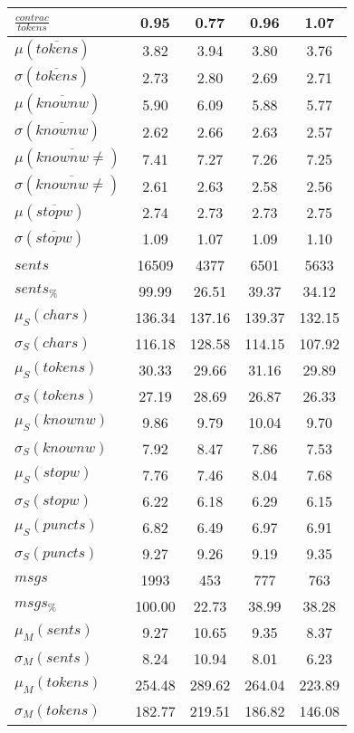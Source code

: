 \begin{table}[h!]
\begin{center}
\begin{tabular}{| l || c | c | c | c |}
$\frac{contrac}{tokens}$ & 0.95  & 0.77  & 0.96  & 1.07 \\\hline\hline
$\mu(\overline{tokens})$ & 3.82  & 3.94  & 3.80  & 3.76 \\
$\sigma(\overline{tokens})$ & 2.73  & 2.80  & 2.69  & 2.71 \\\hline
$\mu(\overline{knownw})$ & 5.90  & 6.09  & 5.88  & 5.77 \\
$\sigma(\overline{knownw})$ & 2.62  & 2.66  & 2.63  & 2.57 \\\hline
$\mu(\overline{knownw \neq})$ & 7.41  & 7.27  & 7.26  & 7.25 \\
$\sigma(\overline{knownw \neq})$ & 2.61  & 2.63  & 2.58  & 2.56 \\\hline
$\mu(\overline{stopw})$ & 2.74  & 2.73  & 2.73  & 2.75 \\
$\sigma(\overline{stopw})$ & 1.09  & 1.07  & 1.09  & 1.10 \\\hline\hline
$sents$ & 16509  & 4377  & 6501  & 5633 \\
$sents_{\%}$ & 99.99  & 26.51  & 39.37  & 34.12 \\\hline
$\mu_S(chars)$ & 136.34  & 137.16  & 139.37  & 132.15 \\
$\sigma_S(chars)$ & 116.18  & 128.58  & 114.15  & 107.92 \\\hline
$\mu_S(tokens)$ & 30.33  & 29.66  & 31.16  & 29.89 \\
$\sigma_S(tokens)$ & 27.19  & 28.69  & 26.87  & 26.33 \\\hline
$\mu_S(knownw)$ & 9.86  & 9.79  & 10.04  & 9.70 \\
$\sigma_S(knownw)$ & 7.92  & 8.47  & 7.86  & 7.53 \\\hline
$\mu_S(stopw)$ & 7.76  & 7.46  & 8.04  & 7.68 \\
$\sigma_S(stopw)$ & 6.22  & 6.18  & 6.29  & 6.15 \\\hline
$\mu_S(puncts)$ & 6.82  & 6.49  & 6.97  & 6.91 \\
$\sigma_S(puncts)$ & 9.27  & 9.26  & 9.19  & 9.35 \\\hline\hline
$msgs$ & 1993  & 453  & 777  & 763 \\
$msgs_{\%}$ & 100.00  & 22.73  & 38.99  & 38.28 \\\hline
$\mu_M(sents)$ & 9.27  & 10.65  & 9.35  & 8.37 \\
$\sigma_M(sents)$ & 8.24  & 10.94  & 8.01  & 6.23 \\\hline
$\mu_M(tokens)$ & 254.48  & 289.62  & 264.04  & 223.89 \\
$\sigma_M(tokens)$ & 182.77  & 219.51  & 186.82  & 146.08 \\\hline

\end{tabular}
\end{center}
\end{table}
